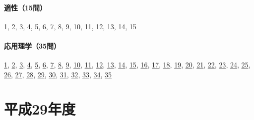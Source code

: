 \paragraph{適性（15問）} \hyperref[q:h28-reg-apt-01]{1}, \hyperref[q:h28-reg-apt-02]{2}, \hyperref[q:h28-reg-apt-03]{3}, \hyperref[q:h28-reg-apt-04]{4}, \hyperref[q:h28-reg-apt-05]{5}, \hyperref[q:h28-reg-apt-06]{6}, \hyperref[q:h28-reg-apt-07]{7}, \hyperref[q:h28-reg-apt-08]{8}, \hyperref[q:h28-reg-apt-09]{9}, \hyperref[q:h28-reg-apt-10]{10}, \hyperref[q:h28-reg-apt-11]{11}, \hyperref[q:h28-reg-apt-12]{12}, \hyperref[q:h28-reg-apt-13]{13}, \hyperref[q:h28-reg-apt-14]{14}, \hyperref[q:h28-reg-apt-15]{15}
\paragraph{応用理学（35問）} \hyperref[q:h28-reg-applied-01]{1}, \hyperref[q:h28-reg-applied-02]{2}, \hyperref[q:h28-reg-applied-03]{3}, \hyperref[q:h28-reg-applied-04]{4}, \hyperref[q:h28-reg-applied-05]{5}, \hyperref[q:h28-reg-applied-06]{6}, \hyperref[q:h28-reg-applied-07]{7}, \hyperref[q:h28-reg-applied-08]{8}, \hyperref[q:h28-reg-applied-09]{9}, \hyperref[q:h28-reg-applied-10]{10}, \hyperref[q:h28-reg-applied-11]{11}, \hyperref[q:h28-reg-applied-12]{12}, \hyperref[q:h28-reg-applied-13]{13}, \hyperref[q:h28-reg-applied-14]{14}, \hyperref[q:h28-reg-applied-15]{15}, \hyperref[q:h28-reg-applied-16]{16}, \hyperref[q:h28-reg-applied-17]{17}, \hyperref[q:h28-reg-applied-18]{18}, \hyperref[q:h28-reg-applied-19]{19}, \hyperref[q:h28-reg-applied-20]{20}, \hyperref[q:h28-reg-applied-21]{21}, \hyperref[q:h28-reg-applied-22]{22}, \hyperref[q:h28-reg-applied-23]{23}, \hyperref[q:h28-reg-applied-24]{24}, \hyperref[q:h28-reg-applied-25]{25}, \hyperref[q:h28-reg-applied-26]{26}, \hyperref[q:h28-reg-applied-27]{27}, \hyperref[q:h28-reg-applied-28]{28}, \hyperref[q:h28-reg-applied-29]{29}, \hyperref[q:h28-reg-applied-30]{30}, \hyperref[q:h28-reg-applied-31]{31}, \hyperref[q:h28-reg-applied-32]{32}, \hyperref[q:h28-reg-applied-33]{33}, \hyperref[q:h28-reg-applied-34]{34}, \hyperref[q:h28-reg-applied-35]{35}
\section{平成29年度}
